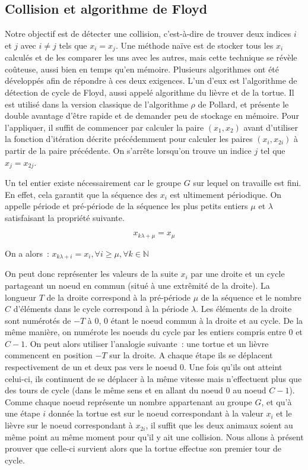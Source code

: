         \subsection{Collision et algorithme de Floyd}
        \label{chapter1:Floyd}
        Notre objectif est de détecter une collision, c'est-à-dire de trouver deux indices $i$ et $j$ avec $i \ne j$ tels que $x_i = x_j$. Une méthode naïve est de stocker tous les $x_i$ calculés et de les comparer les uns avec les autres, mais cette technique se révèle coûteuse, aussi bien en temps qu'en mémoire. Plusieurs algorithmes ont été développés afin de répondre à ces deux exigences. L'un d'eux est l'algorithme de détection de cycle de Floyd, aussi appelé algorithme du lièvre et de la tortue. Il est utilisé dans la version classique de l'algorithme \texorpdfstring{$\rho$}{Rho} de Pollard, et présente le double avantage d'être rapide et de demander peu de stockage en mémoire. Pour l'appliquer, il suffit de commencer par calculer la paire $(x_1, x_2)$ avant d'utiliser la fonction d'itération décrite précédemment pour calculer les paires $(x_i, x_{2i})$ à partir de la paire précédente. On s'arrête lorsqu'on trouve un indice $j$ tel que $x_j = x_{2j}$.

        Un tel entier existe nécessairement car le groupe $G$ sur lequel on travaille est fini. En effet, cela garantit que la séquence des $x_i$ est ultimement périodique. On appelle période et pré-période de la séquence les plus petits entiers $\mu$ et $\lambda$ satisfaisant la propriété suivante.

        \[ x_{k\lambda+\mu} = x_\mu \]

        On a alors~: $ x_{k\lambda+i} = x_i, \forall i \ge \mu, \forall k \in \mathbb{N}$

        On peut donc représenter les valeurs de la suite $x_i$ par une droite et un cycle partageant un noeud en commun (situé à une extrêmité de la droite). La longueur $T$ de la droite correspond à la pré-période $\mu$ de la séquence et le nombre $C$ d'éléments dans le cycle correspond à la période $\lambda$. Les éléments de la droite sont numérotés de $-T$ à $0$, $0$ étant le noeud commun à la droite et au cycle. De la même manière, on numérote les noeuds du cycle par les entiers compris entre $0$ et $C-1$. On peut alors utiliser l'analogie suivante~: une tortue et un lièvre commencent en position $-T$ sur la droite. A chaque étape ils se déplacent respectivement de un et deux pas vers le noeud $0$. Une fois qu'ils ont atteint celui-ci, ils continuent de se déplacer à la même vitesse mais n'effectuent plus que des tours de cycle (dans le même sens et en allant du noeud $0$ au noeud $C-1$). Comme chaque noeud représente un nombre appartenant au groupe $G$, et qu'à une étape $i$ donnée la tortue est sur le noeud correspondant à la valeur $x_i$ et le lièvre sur le noeud correspondant à $x_{2i}$, il suffit que les deux animaux soient au même point au même moment pour qu'il y ait une collision. Nous allons à présent prouver que celle-ci survient alors que la tortue effectue son premier tour de cycle.

